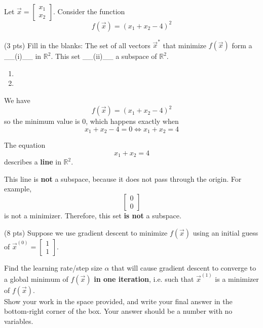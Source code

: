 \documentclass[11pt]{article}
\begin{document}
\begin{prob}[(11 pts)]
Let $\vec x = \begin{bmatrix} x_1 \\ x_2 \end{bmatrix}$. Consider the function
$$f(\vec x) = (x_1 + x_2 - 4)^2$$

\begin{subprob}(3 pts)
Fill in the blanks: The set of all vectors $\vec x^*$ that minimize $f(\vec x)$ form a \_\_(i)\_\_ in $\mathbb{R}^2$. This set \_\_(ii)\_\_ a subspace of $\mathbb{R}^2$.

\begin{enumerate}[label=(\roman*)]
    \item {}  
    \item {} 
\end{enumerate}

\begin{solution}
We have
\[
f(\vec x) = (x_1 + x_2 - 4)^2
\]
so the minimum value is 0, which happens exactly when
\[
x_1 + x_2 - 4 = 0 \iff x_1 + x_2 = 4
\]

The equation
\[
x_1 + x_2 = 4
\]
describes a \textbf{line} in $\mathbb{R}^2$.

This line is \textbf{not} a subspace, because it does not pass through the origin. For example,
\[
\begin{bmatrix} 0 \\ 0 \end{bmatrix}
\]
is not a minimizer. Therefore, this set \textbf{is not} a subspace.
\end{solution}
\end{subprob}

\begin{subprob}(8 pts)
Suppose we use gradient descent to minimize $f(\vec x)$ using an initial guess of $\vec x^{(0)} = \begin{bmatrix} 1 \\ 1 \end{bmatrix}$. 

Find the learning rate/step size $\alpha$ that will cause gradient descent to converge to a global minimum of $f(\vec x)$ \textbf{in one iteration}, i.e. such that $\vec x^{(1)}$ is a minimizer of $f(\vec x)$. \\

Show your work in the space provided, and write your final answer in the bottom-right corner of the box. Your answer should be a number with no variables.\\


\end{subprob}
\end{prob}
\end{document}
